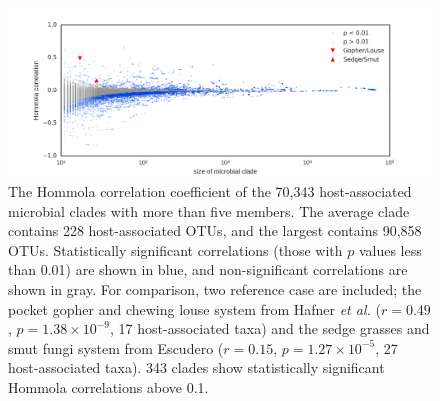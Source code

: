 \begin{figure}
    \includegraphics[width=\textwidth]{FishPoo/figures/Hommola_correlations.png}
    \caption{The Hommola correlation coefficient of the 70,343 host-associated microbial clades with more than five members. The average clade contains 228 host-associated OTUs, and the largest contains 90,858 OTUs. Statistically significant correlations (those with $p$ values less than 0.01) are shown in blue, and non-significant correlations are shown in gray. For comparison, two reference case are included; the pocket gopher and chewing louse system from Hafner {\em et al.} ($r=0.49$, $p=1.38\times 10^{-9}$, 17 host-associated taxa) and the sedge grasses and smut fungi system from Escudero ($r=0.15$, $p=1.27\times 10^{-5}$, 27 host-associated taxa). \cite{hafner1994disparate,escudero2015phylogenetic} 343 clades show statistically significant Hommola correlations above 0.1.}
    \label{FP_hommola_corr}
\end{figure}
